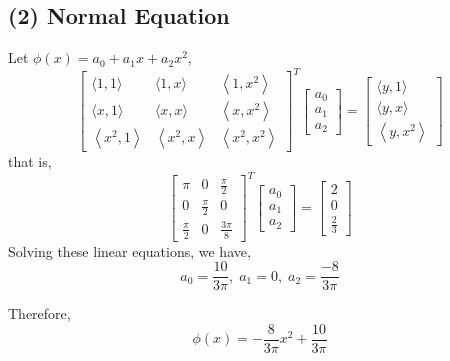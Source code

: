 \documentclass[11pt,a4paper]{article}
\theoremstyle{plain}
\begin{document}
\subsection*{(2) Normal Equation}
\noindent Let $\phi(x) = a_0 + a_1x+a_2x^2$,\\
\begin{equation}
\left[\begin{array}{ccc}
\langle 1,1\rangle & \langle 1, x\rangle & \left\langle 1, x^2\right\rangle \\
\langle x, 1\rangle & \langle x, x\rangle & \left\langle x, x^2\right\rangle \\
\left\langle x^2, 1\right\rangle & \left\langle x^2, x\right\rangle & \left\langle x^2, x^2\right\rangle
\end{array}\right]^T\left[\begin{array}{l}
a_0 \\
a_1 \\
a_2
\end{array}\right]=\left[\begin{array}{c}
\langle y, 1\rangle \\
\langle y, x\rangle \\
\left\langle y, x^2\right\rangle
\end{array}\right]
\end{equation}
that is,\\
\begin{equation}
\left[\begin{array}{ccc}
\pi & 0 & \frac{\pi}{2} \\
0 & \frac{\pi}{2} & 0 \\
\frac{\pi}{2} & 0 & \frac{3 \pi}{8}
\end{array}\right]^T\left[\begin{array}{l}
a_0 \\
a_1 \\
a_2
\end{array}\right]=\left[\begin{array}{c}
2 \\
0 \\
\frac{2}{3}
\end{array}\right]
\end{equation}
\noindent Solving these linear equations, we have,
\begin{equation}
    a_0 = \frac{10}{3\pi},\; a_1 = 0,\;a_2 = \frac{-8}{3\pi}
\end{equation}

\noindent Therefore,\\
\begin{equation}
    \phi(x) = -\frac{8}{3 \pi} x^2+\frac{10}{3 \pi}
\end{equation}
\end{document}
